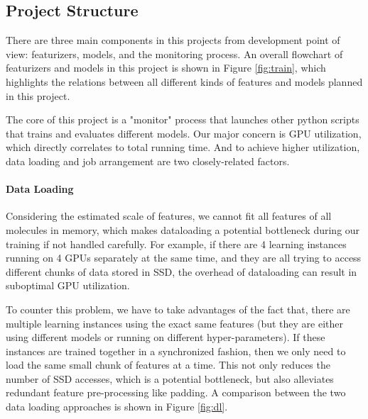 \documentclass[conference]{IEEEtran}
\begin{document}
\subsection{Project Structure} \label{subsec_struct}

There are three main components in this projects from development point of view: featurizers, models, and the monitoring process. 
An overall flowchart of featurizers and models in this project is shown in Figure \ref{fig:train}, which highlights the relations between all different kinds of features and models planned in this project. 

The core of this project is a "monitor" process that launches other python scripts that trains and evaluates different models. 
Our major concern is GPU utilization, which directly correlates to total running time. 
And to achieve higher utilization, data loading and job arrangement are two closely-related factors. 

\paragraph{Data Loading} 

Considering the estimated scale of features, we cannot fit all features of all molecules in memory, which makes dataloading a potential bottleneck during our training if not handled carefully. 
For example, if there are 4 learning instances running on 4 GPUs separately at the same time, and they are all trying to access different chunks of data stored in SSD, the overhead of dataloading can result in suboptimal GPU utilization. 

To counter this problem, we have to take advantages of the fact that, there are multiple learning instances using the exact same features (but they are either using different models or running on different hyper-parameters). 
If these instances are trained together in a synchronized fashion, then we only need to load the same small chunk of features at a time. 
This not only reduces the number of SSD accesses, which is a potential bottleneck, but also alleviates redundant feature pre-processing like padding. 
A comparison between the two data loading approaches is shown in Figure \ref{fig:dl}.
\end{document}
